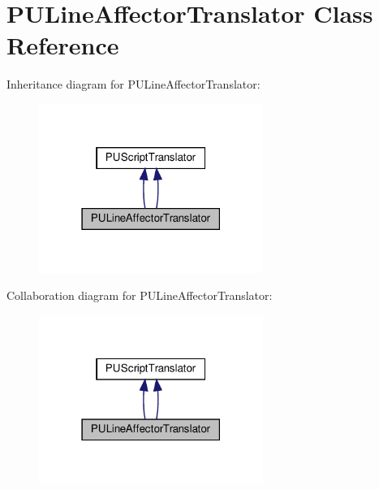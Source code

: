 \hypertarget{classPULineAffectorTranslator}{}\section{P\+U\+Line\+Affector\+Translator Class Reference}
\label{classPULineAffectorTranslator}


Inheritance diagram for P\+U\+Line\+Affector\+Translator\+:
\nopagebreak
\begin{figure}[H]
\begin{center}
\leavevmode
\includegraphics[width=207pt]{classPULineAffectorTranslator__inherit__graph}
\end{center}
\end{figure}


Collaboration diagram for P\+U\+Line\+Affector\+Translator\+:
\nopagebreak
\begin{figure}[H]
\begin{center}
\leavevmode
\includegraphics[width=207pt]{classPULineAffectorTranslator__coll__graph}
\end{center}
\end{figure}
